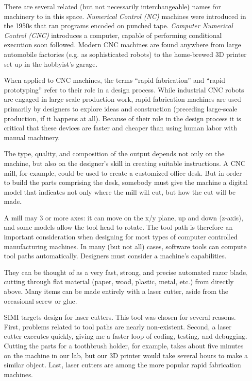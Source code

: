 There are several related (but not necessarily interchangeable) names
for machinery to in this space. \textit{Numerical Control (NC)}
machines were introduced in the 1950s that ran programs encoded on
punched tape. \textit{Computer Numerical Control (CNC)} introduces a
computer, capable of performing conditional execution soon
followed. Modern CNC machines are found anywhere from large automobile
factories (e.g. as sophisticated robots) to the home-brewed 3D printer
set up in the hobbyist's garage.

When applied to CNC machines, the terms ``rapid fabrication'' and
``rapid prototyping'' refer to their role in a design process. While
industrial CNC robots are engaged in large-scale production work,
rapid fabrication machines are used primarily by designers to explore
ideas and construction (preceding large-scale production, if it
happens at all). Because of their role in the design process it is
critical that these devices are faster and cheaper than using human
labor with manual machinery.

The type, quality, and composition of the output depends not only on
the machine, but also on the designer's skill in creating suitable
instructions. A CNC mill, for example, could be used to create a
customized office desk. But in order to build the parts comprising the
desk, somebody must give the machine a digital model that indicates
not only where the mill will cut, but how the cut will be made.

A mill may 3 or more axes: it can move on the x/y plane, up and down
(z-axis), and some models allow the tool head to rotate. The tool path
is therefore an important consideration when designing for most types
of computer controlled manufacturing machines. In many (but not all)
cases, software tools can compute tool paths automatically. Designers
must consider a machine's capabilities.

They can be thought of as a very fast, strong, and precise
automated razor blade, cutting through flat material (paper, wood,
plastic, metal, etc.) from directly above. Many items can be made
entirely with a laser cutter, aside from the occasional screw or
glue. 

SIMI targets design for laser cutters. This tool was chosen for
several reasons. First, problems related to tool paths are nearly
non-existent. Second, a laser cutter executes quickly, giving me a
faster loop of coding, testing, and debugging. Cutting the parts for a
toothbrush holder, for example, takes about five minutes on the
machine in our lab, but our 3D printer would take several hours to
make a similar object. Last, laser cutters are among the more popular
rapid fabrication machines.

